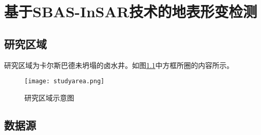 \chapter{基于SBAS-InSAR技术的地表形变检测}

\section{研究区域}

研究区域为卡尔斯巴德未坍塌的卤水井。如图\ref{fig:studyarea}中方框所圈的内容所示。
\begin{figure}[htb]
    \centering
    \texttt{[image: studyarea.png]}
    \caption{研究区域示意图}
    \label{fig:studyarea}
\end{figure}

\section{数据源}

